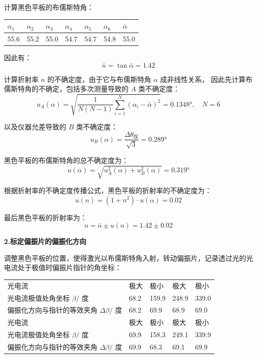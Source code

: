 \documentclass{Phyport}
\begin{document}
计算黑色平板的布儒斯特角：
\begin{table}[htbp!]
    \centering
    \begin{tabular}{|l|l|l|l|l|l|l|}
        \hline
        $\alpha_1$ & $\alpha_2$ & $\alpha_3$ & $\alpha_4$ & $\alpha_5$ & $\alpha_6$ & $\bar{\alpha}$ \\
        \hline
        55.6 & 55.2 & 55.0 & 54.7 & 54.7 & 54.8 & 55.0 \\
        \hline
    \end{tabular}
\end{table}

因此有：
\[
\bar{n} = \tan{\bar{\alpha}} = 1.42
\]

计算折射率 $n$ 的不确定度，由于它与布儒斯特角 $\alpha$ 成非线性关系，
因此先计算布儒斯特角的不确定，包括多次测量导致的 $A$ 类不确定度：
\[
u_A(\alpha) = \sqrt{\frac{1}{N(N - 1)} \sum_{i=1}^N (\alpha_i - \bar{\alpha})^2} = 0.1348 ° , \quad N = 6
\]

以及仪器允差导致的 $B$ 类不确定度：
\[
u_B(\alpha) = \frac{\Delta \theta_仪}{\sqrt{3}} = 0.289 °
\]

黑色平板的布儒斯特角的总不确定度为：
\[
u(\alpha) = \sqrt{u_A^2(\alpha) + u_B^2(\alpha)} = 0.319 °
\]

根据折射率的不确定度传播公式，黑色平板的折射率的不确定度为：
\[
u(n) = (1 + n^2) \cdot u(\alpha) = 0.02
\]

最后黑色平板的折射率为：
\[
n = \bar{n} \pm u(n) = 1.42 \pm 0.02
\]

\textbf{2.标定偏振片的偏振化方向}

调整黑色平板的位置，使得激光以布儒斯特角入射，转动偏振片，记录透过光的光电流处于极值时偏振片指针的角坐标：

\begin{table}[htbp!]
    \centering
\begin{tabular}{|l|l|l|l|l|}
    \hline
    光电流 & 极大 & 极小 & 极大 & 极小 \\
    光电流极值处角坐标 $\beta /$ 度 & 68.2 & 159.9 & 248.9 & 339.0 \\
    偏振化方向与指针的等效夹角 $\Delta \beta /$ 度 & 68.2 & 69.9 & 68.9 & 69.0 \\
    \hline
    光电流 & 极大 & 极小 & 极大 & 极小 \\
    光电流极值处角坐标 $\beta /$ 度 & 69.9 & 158.3 & 249.1 & 339.9 \\
    偏振化方向与指针的等效夹角 $\Delta \beta /$ 度 & 69.9 & 68.3 & 69.1 & 69.9 \\
    \hline
\end{tabular}
\end{table}
\FloatBarrier
\end{document}
